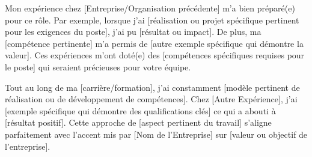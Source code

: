 
Mon expérience chez [Entreprise/Organisation précédente] m'a bien préparé(e) pour ce rôle. Par exemple, lorsque j'ai [réalisation ou projet spécifique pertinent pour les exigences du poste], j'ai pu [résultat ou impact]. De plus, ma [compétence pertinente] m'a permis de [autre exemple spécifique qui démontre la valeur]. Ces expériences m'ont doté(e) des [compétences spécifiques requises pour le poste] qui seraient précieuses pour votre équipe.

Tout au long de ma [carrière/formation], j'ai constamment [modèle pertinent de réalisation ou de développement de compétences]. Chez [Autre Expérience], j'ai [exemple spécifique qui démontre des qualifications clés] ce qui a abouti à [résultat positif]. Cette approche de [aspect pertinent du travail] s'aligne parfaitement avec l'accent mis par [Nom de l'Entreprise] sur [valeur ou objectif de l'entreprise].
